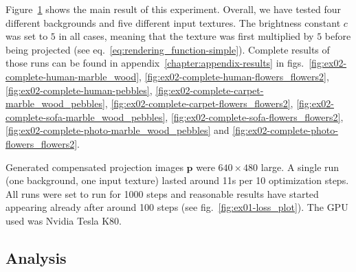 \begin{figure}[]
    \label{fig:ex02-human-marble}
\end{figure}

Figure~\ref{fig:ex02-human-marble} shows the main result of this experiment. Overall, we have tested four different backgrounds and five different input textures. The brightness constant \(c\) was set to \(5\) in all cases, meaning that the texture was first multiplied by \(5\) before being projected (see eq.~\ref{eq:rendering_function-simple}). Complete results of those runs can be found in appendix~\ref{chapter:appendix-results} in figs.~\ref{fig:ex02-complete-human-marble_wood}, \ref{fig:ex02-complete-human-flowers_flowers2}, \ref{fig:ex02-complete-human-pebbles}, \ref{fig:ex02-complete-carpet-marble_wood_pebbles}, \ref{fig:ex02-complete-carpet-flowers_flowers2}, \ref{fig:ex02-complete-sofa-marble_wood_pebbles}, \ref{fig:ex02-complete-sofa-flowers_flowers2}, \ref{fig:ex02-complete-photo-marble_wood_pebbles} and \ref{fig:ex02-complete-photo-flowers_flowers2}.

Generated compensated projection images \(\bm{p}\) were \(640 \times 480\) large. A single run (one background, one input texture) lasted around 11s per 10 optimization steps. All runs were set to run for 1000 steps and reasonable results have started appearing already after around 100 steps (see fig.~\ref{fig:ex01-loss_plot}). The GPU used was Nvidia Tesla K80.

\subsection{Analysis}
\label{section:results-experiments-02-analysis}

